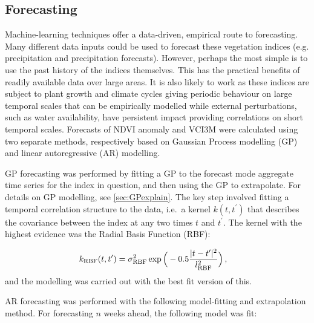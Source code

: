 \documentclass[review]{elsarticle}
\begin{document}
\subsection{Forecasting}\label{forecast_method}
Machine-learning techniques offer a data-driven, empirical route to forecasting. Many different data inputs could be used to forecast these vegetation indices (e.g. precipitation and precipitation forecasts). However, perhaps the most simple is to use the past history of the indices themselves. This has the practical benefits of readily available data over large areas. It is also likely to work as these indices are subject to plant growth and climate cycles giving periodic behaviour on large temporal scales that can be empirically modelled while external perturbations, such as water availability, have persistent impact providing correlations on short temporal scales. Forecasts of NDVI anomaly and VCI3M were calculated using two separate methods, respectively based on Gaussian Process modelling (GP) and linear autoregressive (AR) modelling.

GP forecasting was performed by fitting a GP to the forecast mode aggregate time series for the index in question, and then using the GP to extrapolate. For details on GP modelling, see \ref{sec:GPexplain}. The key step involved fitting a temporal correlation structure to the data, i.e.~a kernel $k(t,t^{\prime})$ that describes the covariance between the index at any two times $t$ and $t^{\prime}$. The kernel with the highest evidence was the Radial Basis Function (RBF):

\begin{align}
	k_{\rm{RBF}}(t,t') &= \sigma_{\rm{RBF}}^2 \exp{\Big( -0.5 \frac{|t-t'|^2}{l_{\rm{RBF}}^2} \Big) }\,,
\end{align}
and the modelling was carried out with the best fit version of this.

AR forecasting was performed with the following model-fitting and extrapolation method. For forecasting $n$ weeks ahead, the following model was fit:
\end{document}

